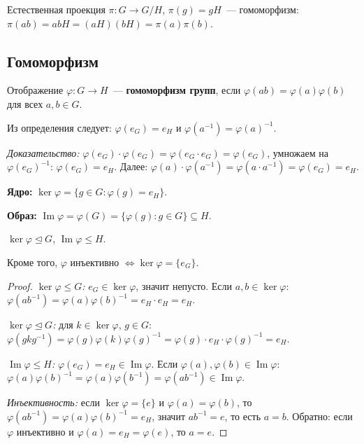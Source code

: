 \documentclass[12pt]{article}
\begin{document}
	\begin{note}
		Естественная проекция $\pi: G \to G/H$, $\pi(g) = gH$~--- гомоморфизм: $\pi(ab) = abH = (aH)(bH) = \pi(a)\pi(b)$.
	\end{note}
	
	\subsection{Гомоморфизм}
	
	\begin{definition}
		Отображение $\varphi: G \to H$~--- \textbf{гомоморфизм групп}, если $\varphi(ab) = \varphi(a)\varphi(b)$ для всех $a, b \in G$.
	\end{definition}
	
	\begin{note}
		Из определения следует: $\varphi(e_G) = e_H$ и $\varphi(a^{-1}) = \varphi(a)^{-1}$.
		
		\textit{Доказательство:} $\varphi(e_G) \cdot \varphi(e_G) = \varphi(e_G \cdot e_G) = \varphi(e_G)$, умножаем на $\varphi(e_G)^{-1}$: $\varphi(e_G) = e_H$. Далее: $\varphi(a) \cdot \varphi(a^{-1}) = \varphi(a \cdot a^{-1}) = \varphi(e_G) = e_H$.
	\end{note}
	
	\begin{definition}
		\textbf{Ядро:} $\ker \varphi = \{g \in G : \varphi(g) = e_H\}$.
		
		\textbf{Образ:} $\operatorname{Im} \varphi = \varphi(G) = \{\varphi(g) : g \in G\} \subseteq H$.
	\end{definition}
	
	\begin{theorem}
		$\ker \varphi \trianglelefteq G$, $\operatorname{Im} \varphi \leqslant H$.
		
		Кроме того, $\varphi$ инъективно $\Leftrightarrow \ker \varphi = \{e_G\}$.
	\end{theorem}
	
	\begin{proof}
		\textit{$\ker \varphi \leqslant G$:} $e_G \in \ker \varphi$, значит непусто. Если $a, b \in \ker \varphi$: $\varphi(ab^{-1}) = \varphi(a)\varphi(b)^{-1} = e_H \cdot e_H = e_H$.
		
		\textit{$\ker \varphi \trianglelefteq G$:} для $k \in \ker \varphi$, $g \in G$: $\varphi(gkg^{-1}) = \varphi(g)\varphi(k)\varphi(g)^{-1} = \varphi(g) \cdot e_H \cdot \varphi(g)^{-1} = e_H$.
		
		\textit{$\operatorname{Im} \varphi \leqslant H$:} $\varphi(e_G) = e_H \in \operatorname{Im} \varphi$. Если $\varphi(a), \varphi(b) \in \operatorname{Im} \varphi$: $\varphi(a)\varphi(b)^{-1} = \varphi(a)\varphi(b^{-1}) = \varphi(ab^{-1}) \in \operatorname{Im} \varphi$.
		
		\textit{Инъективность:} если $\ker \varphi = \{e\}$ и $\varphi(a) = \varphi(b)$, то $\varphi(ab^{-1}) = \varphi(a)\varphi(b)^{-1} = e_H$, значит $ab^{-1} = e$, то есть $a = b$. Обратно: если $\varphi$ инъективно и $\varphi(a) = e_H = \varphi(e)$, то $a = e$.
	\end{proof}
	
\end{document}
